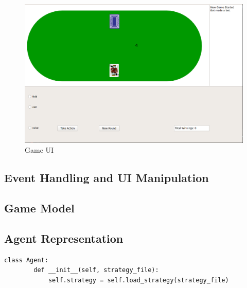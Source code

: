 \begin{figure}[ht]
    \includegraphics[scale=.4]{images/UI_screenshot.png}
    \caption{Game UI}
\end{figure}

\subsection{Event Handling and UI Manipulation}\label{subsec:eventHandling}


\subsection{Game Model}\label{subsec:gameModel}

\subsection{Agent Representation}\label{subsec:agent}

\begin{lstlisting}[style=Python]
    class Agent:
        def __init__(self, strategy_file):
            self.strategy = self.load_strategy(strategy_file)
\end{lstlisting}

